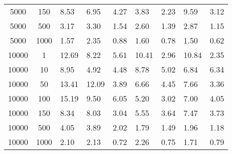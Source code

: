 \begin{table*}
\begin{center}
\begin{tabular}{cc|lllllll}
5000  & 150  & 8.53   & 6.95   & 4.27   & 3.83   & 2.23  & 9.59   & 3.12  \\ 
5000  & 500  & 3.17   & 3.30   & 1.54   & 2.60   & 1.39  & 2.87   & 1.15  \\ 
5000  & 1000 & 1.57   & 2.35   & 0.88   & 1.60   & 0.78  & 1.50   & 0.62  \\ 
10000 & 1    & 12.69  & 8.22   & 5.61   & 10.41  & 2.96  & 10.84  & 2.35  \\ 
10000 & 10   & 8.95   & 4.92   & 4.48   & 8.78   & 5.02  & 6.84   & 6.34  \\ 
10000 & 50   & 13.41  & 12.09  & 3.89   & 6.66   & 4.45  & 7.66   & 3.36  \\ 
10000 & 100  & 15.19  & 9.50   & 6.05   & 5.20   & 3.02  & 7.00   & 4.05  \\ 
10000 & 150  & 8.34   & 8.03   & 3.04   & 5.55   & 3.64  & 7.47   & 3.73  \\ 
10000 & 500  & 4.05   & 3.89   & 2.02   & 1.79   & 1.49  & 1.96   & 1.18  \\ 
10000 & 1000 & 2.10   & 2.13   & 0.72   & 2.26   & 0.75  & 1.71   & 0.79  \\ \hline
\end{tabular}
\end{center}
\end{table*}

